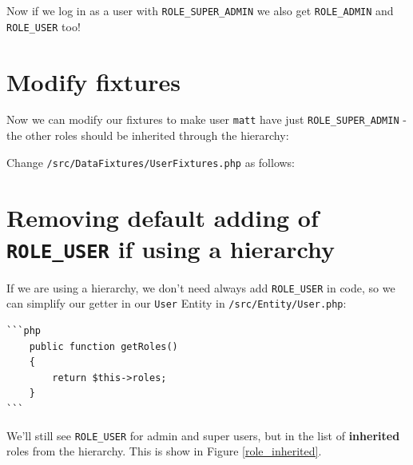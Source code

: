\documentclass[a4paperpaper,openright]{book}
\newenvironment{Shaded}{}{}
\newcommand{\KeywordTok}[1]{\textcolor[rgb]{0.00,0.44,0.13}{\textbf{#1}}}
\newcommand{\NormalTok}[1]{#1}
\newcommand{\OtherTok}[1]{\textcolor[rgb]{0.00,0.44,0.13}{#1}}
\newcommand{\StringTok}[1]{\textcolor[rgb]{0.25,0.44,0.63}{#1}}
\begin{document}
Now if we log in as a user with \texttt{ROLE\_SUPER\_ADMIN} we also get
\texttt{ROLE\_ADMIN} and \texttt{ROLE\_USER} too!

\hypertarget{modify-fixtures}{%
\section{Modify fixtures}\label{modify-fixtures}}

Now we can modify our fixtures to make user \texttt{matt} have just
\texttt{ROLE\_SUPER\_ADMIN} - the other roles should be inherited
through the hierarchy:

Change \texttt{/src/DataFixtures/UserFixtures.php} as follows:

\begin{Shaded}
\end{Shaded}

\hypertarget{removing-default-adding-of-role_user-if-using-a-hierarchy}{%
\section{\texorpdfstring{Removing default adding of \texttt{ROLE\_USER}
if using a
hierarchy}{Removing default adding of ROLE\_USER if using a hierarchy}}\label{removing-default-adding-of-role_user-if-using-a-hierarchy}}

If we are using a hierarchy, we don't need always add
\texttt{ROLE\_USER} in code, so we can simplify our getter in our
\texttt{User} Entity in \texttt{/src/Entity/User.php}:

\begin{verbatim}
```php
    public function getRoles()
    {
        return $this->roles;
    }
```
\end{verbatim}

We'll still see \texttt{ROLE\_USER} for admin and super users, but in
the list of \textbf{inherited} roles from the hierarchy. This is show in
Figure \ref{role_inherited}.
\end{document}
